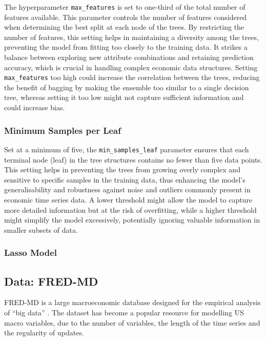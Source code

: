 The hyperparameter \texttt{max\_features} is set to one-third of the total number of features available. This parameter controls the number of features considered when determining the best split at each node of the trees. By restricting the number of features, this setting helps in maintaining a diversity among the trees, preventing the model from fitting too closely to the training data. It strikes a balance between exploring new attribute combinations and retaining prediction accuracy, which is crucial in handling complex economic data structures. Setting \texttt{max\_features} too high could increase the correlation between the trees, reducing the benefit of bagging by making the ensemble too similar to a single decision tree, whereas setting it too low might not capture sufficient information and could increase bias.

\subsubsection*{Minimum Samples per Leaf}

Set at a minimum of five, the \texttt{min\_samples\_leaf} parameter ensures that each terminal node (leaf) in the tree structures contains no fewer than five data points. This setting helps in preventing the trees from growing overly complex and sensitive to specific samples in the training data, thus enhancing the model's generalisability and robustness against noise and outliers commonly present in economic time series data. A lower threshold might allow the model to capture more detailed information but at the risk of overfitting, while a higher threshold might simplify the model excessively, potentially ignoring valuable information in smaller subsets of data.

\subsubsection{Lasso Model}





\subsection{Data: FRED-MD} \label{sec:methods_data}

FRED-MD is a large macroeconomic database designed for the empirical analysis of “big data” \autocite{McCracken2016FRED-MD:Research}. The dataset has become a popular resource for modelling US macro variables, due to the number of variables, the length of the time series and the regularity of updates.


